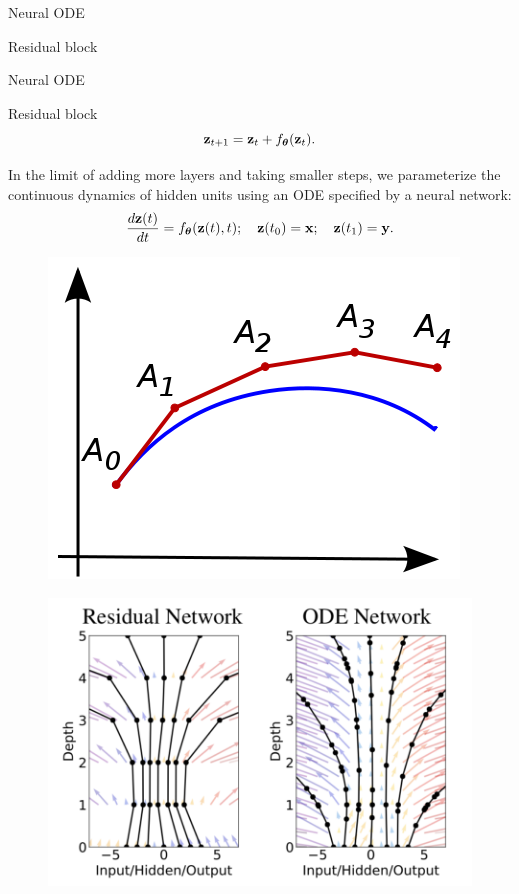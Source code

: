 \begin{frame}{Neural ODE}
\begin{block}{Residual block}
\begin{minipage}[t]{0.3\columnwidth}
\begin{figure}
			\end{figure}
		\end{minipage}
		\vspace{-0.4cm}
	\end{block}

\end{frame}
\begin{frame}{Neural ODE}
	\begin{block}{Residual block}
	\vspace{-0.4cm}
	\[
	    \mathbf{z}_{t+1} = \mathbf{z}_t + f_{\boldsymbol{\theta}}(\mathbf{z}_t).
	\]
	\vspace{-0.4cm}
	\end{block}
	In the limit of adding more layers and taking smaller steps, we parameterize the continuous dynamics of hidden units using an ODE specified by a neural network: 
	\[
	    \frac{d \mathbf{z}(t)}{dt} = f_{\boldsymbol{\theta}}(\mathbf{z}(t), t); \quad \mathbf{z}(t_0) = \mathbf{x}; \quad \mathbf{z}(t_1) = \mathbf{y}.
	\]
	\begin{minipage}[t]{0.4\columnwidth}
		\begin{figure}
			\centering
			\includegraphics[width=0.8\linewidth]{figs/euler}
		\end{figure}
	\end{minipage}%
	\begin{minipage}[t]{0.6\columnwidth}
		\vspace{-0.4cm}
		\begin{figure}
			\centering
			\includegraphics[width=0.9\linewidth]{figs/resnet_vs_neural_ode.png}

\end{figure}
\end{minipage}
\end{frame}
